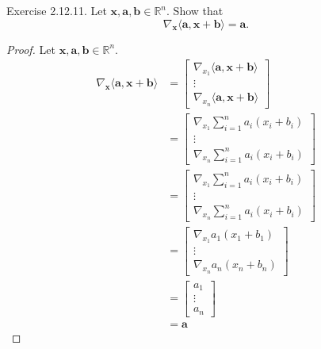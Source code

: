 \documentclass{article}
\theoremstyle{plain}
\begin{document}
\begin{itembox}[l]{Exercise 2.12.11.}
	Let
	\begin{math}
		\bm{x} , \bm{a} , \bm{b} \in \mathbb{R}^n .
	\end{math}
	Show that
	\begin{equation*}
		\nabla_{\bm{x}} \langle \bm{a} , \bm{x} + \bm{b} \rangle = \bm{a} .
	\end{equation*}
\end{itembox}


\begin{proof}
	Let
	\begin{math}
		\bm{x} , \bm{a} , \bm{b} \in \mathbb{R}^n .
	\end{math}
	\begin{equation*}
		\begin{split}
			\nabla_{\bm{x}} \langle \bm{a} , \bm{x} + \bm{b} \rangle &=
			\begin{bmatrix}
				\nabla_{x_1} \langle \bm{a} , \bm{x} + \bm{b} \rangle \\
				\vdots \\
				\nabla_{x_n} \langle \bm{a} , \bm{x} + \bm{b} \rangle
			\end{bmatrix} \\
			&=
			\begin{bmatrix}
				\nabla_{x_1} \sum_{i=1}^n a_i (x_i + b_i) \\
				\vdots \\
				\nabla_{x_n} \sum_{i=1}^n a_i (x_i + b_i)
			\end{bmatrix} \\
			&=
			\begin{bmatrix}
				\nabla_{x_1} \sum_{i=1}^n a_i (x_i + b_i) \\
				\vdots \\
				\nabla_{x_n} \sum_{i=1}^n a_i (x_i + b_i)
			\end{bmatrix} \\
			&=
			\begin{bmatrix}
				\nabla_{x_1} a_1 (x_1 + b_1) \\
				\vdots \\
				\nabla_{x_n} a_n (x_n + b_n)
			\end{bmatrix} \\
			&=
			\begin{bmatrix}
				a_1 \\
				\vdots \\
				a_n
			\end{bmatrix} \\
			&= \bm{a}
		\end{split}
	\end{equation*}
\end{proof}
\end{document}

